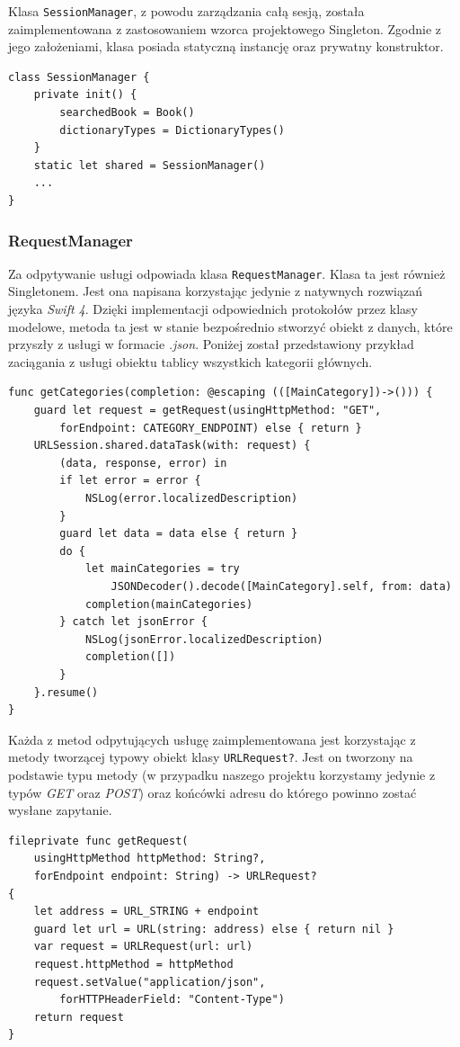 \documentclass[twoside]{projektInzynierskiMS}
\begin{document}
Klasa \verb`SessionManager`, z powodu zarządzania całą sesją, została zaimplementowana z zastosowaniem wzorca projektowego Singleton. Zgodnie z jego założeniami, klasa posiada statyczną instancję oraz prywatny konstruktor.
\begin{verbatim}
class SessionManager {
    private init() {
        searchedBook = Book()
        dictionaryTypes = DictionaryTypes()
    }
    static let shared = SessionManager()
    ...
}
\end{verbatim}


\subsubsection{RequestManager}

Za odpytywanie usługi odpowiada klasa \verb`RequestManager`. Klasa ta jest również Singletonem. Jest ona napisana korzystając jedynie z natywnych rozwiązań języka \textit{Swift 4}. Dzięki implementacji odpowiednich protokołów przez klasy modelowe, metoda ta jest w stanie bezpośrednio stworzyć obiekt z danych, które przyszły z usługi w formacie \textit{.json}. Poniżej został przedstawiony przykład zaciągania z usługi obiektu tablicy wszystkich kategorii głównych.
\begin{verbatim}
func getCategories(completion: @escaping (([MainCategory])->())) {
    guard let request = getRequest(usingHttpMethod: "GET",
        forEndpoint: CATEGORY_ENDPOINT) else { return }
    URLSession.shared.dataTask(with: request) {
        (data, response, error) in
        if let error = error {
            NSLog(error.localizedDescription)
        }
        guard let data = data else { return }
        do {
            let mainCategories = try
                JSONDecoder().decode([MainCategory].self, from: data)
            completion(mainCategories)
        } catch let jsonError {
            NSLog(jsonError.localizedDescription)
            completion([])
        }
    }.resume()
}
\end{verbatim}

Każda z metod odpytujących usługę zaimplementowana jest korzystając z metody tworzącej typowy obiekt klasy \verb`URLRequest?`. Jest on tworzony na podstawie typu metody (w przypadku naszego projektu korzystamy jedynie z typów \textit{GET} oraz \textit{POST}) oraz końcówki adresu do którego powinno zostać wysłane zapytanie.
\begin{verbatim}
fileprivate func getRequest(
    usingHttpMethod httpMethod: String?,
    forEndpoint endpoint: String) -> URLRequest?
{
    let address = URL_STRING + endpoint
    guard let url = URL(string: address) else { return nil }
    var request = URLRequest(url: url)
    request.httpMethod = httpMethod
    request.setValue("application/json",
        forHTTPHeaderField: "Content-Type")
    return request
}
\end{verbatim}
\end{document}
